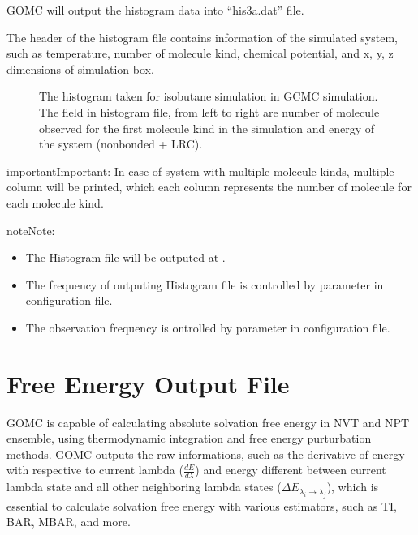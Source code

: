 \documentclass[letterpaper,10pt,english]{sphinxmanual}
\begin{document}
\sphinxAtStartPar
GOMC will output the histogram data into “his3a.dat” file.

\sphinxAtStartPar
The header of the histogram file contains information of the simulated system, such as temperature,
number of molecule kind, chemical potential, and x, y, z dimensions of simulation box.

\begin{figure}[htbp]
\centering
\capstart

\noindent{}
\caption{The histogram taken for isobutane simulation in GCMC simulation. The field in
histogram file, from left to right are number of molecule observed for the first molecule kind
in the simulation and energy of the system (nonbonded + LRC).}\label{\detokenize{output_file:id16}}\end{figure}

\begin{sphinxadmonition}{important}{Important:}
\sphinxAtStartPar
In case of system with multiple molecule kinds, multiple column will be printed, which each column
represents the number of molecule for each molecule kind.
\end{sphinxadmonition}

\begin{sphinxadmonition}{note}{Note:}\begin{itemize}
\item {} 
\sphinxAtStartPar
The Histogram file will be outputed at .

\item {} 
\sphinxAtStartPar
The frequency of outputing Histogram file is controlled by 
parameter in configuration file.

\item {} 
\sphinxAtStartPar
The observation frequency is ontrolled by  parameter in configuration file.

\end{itemize}
\end{sphinxadmonition}


\section{Free Energy Output File}
\label{\detokenize{output_file:free-energy-output-file}}
\sphinxAtStartPar
GOMC is capable of calculating absolute solvation free energy in NVT and NPT ensemble, using
thermodynamic integration and free energy purturbation methods.
GOMC outputs the raw informations, such as the derivative of energy with respective to current
lambda (\(\frac{dE}{d\lambda}\)) and energy different between current lambda state
and all other neighboring lambda states (\(\Delta E_{{\lambda}_i \rightarrow {\lambda}_j}\)),
which is essential to calculate solvation free energy with various estimators, such as TI, BAR, MBAR, and more.
\end{document}
